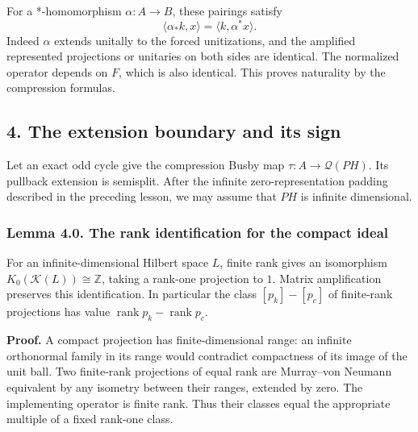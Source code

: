 \documentclass[
  11pt,
]{article}
\begin{document}
For a *-homomorphism \(\alpha:A\to B\), these pairings satisfy \[
\langle\alpha_*k,x\rangle=\langle k,\alpha^*x\rangle.
\tag{3.5}
\] Indeed \(\alpha\) extends unitally to the forced unitizations, and
the amplified represented projections or unitaries on both sides are
identical. The normalized operator depends on \(F\), which is also
identical. This proves naturality by the compression formulas.

\subsection{4. The extension boundary and its
sign}\label{the-extension-boundary-and-its-sign}

Let an exact odd cycle give the compression Busby map
\(\tau:A\to\mathcal Q(PH)\). Its pullback extension is semisplit. After
the infinite zero-representation padding described in the preceding
lesson, we may assume that \(PH\) is infinite dimensional.

\subsubsection{Lemma 4.0. The rank identification for the compact
ideal}\label{lemma-4.0.-the-rank-identification-for-the-compact-ideal}

For an infinite-dimensional Hilbert space \(L\), finite rank gives an
isomorphism \(K_0(\mathcal K(L))\cong\mathbb Z\), taking a rank-one
projection to \(1\). Matrix amplification preserves this identification.
In particular the class \([p_k]-[p_c]\) of finite-rank projections has
value \(\operatorname{rank}p_k-\operatorname{rank}p_c\).

\textbf{Proof.} A compact projection has finite-dimensional range: an
infinite orthonormal family in its range would contradict compactness of
its image of the unit ball. Two finite-rank projections of equal rank
are Murray--von Neumann equivalent by any isometry between their ranges,
extended by zero. The implementing operator is finite rank. Thus their
classes equal the appropriate multiple of a fixed rank-one class.
\end{document}
